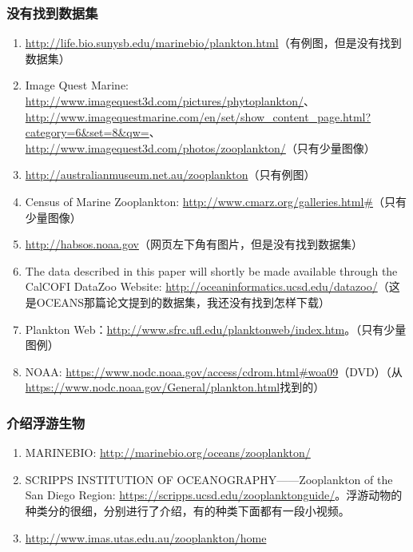 \subsubsection{没有找到数据集}
\begin{enumerate}
\item \url{http://life.bio.sunysb.edu/marinebio/plankton.html}（有例图，但是没有找到数据集）

\item Image Quest Marine: \url{http://www.imagequest3d.com/pictures/phytoplankton/}、\url{http://www.imagequestmarine.com/en/set/show_content_page.html?category=6&set=8&qw=}、\url{http://www.imagequest3d.com/photos/zooplankton/}（只有少量图像）

\item \url{http://australianmuseum.net.au/zooplankton}（只有例图）

\item Census of Marine Zooplankton: \url{http://www.cmarz.org/galleries.html#}（只有少量图像）

\item \url{http://habsos.noaa.gov}（网页左下角有图片，但是没有找到数据集）

\item The data described in this paper will shortly be made available through the CalCOFI DataZoo Website: \url{http://oceaninformatics.ucsd.edu/datazoo/}（这是OCEANS那篇论文提到的数据集，我还没有找到怎样下载）

\item Plankton Web：\url{http://www.sfrc.ufl.edu/planktonweb/index.htm}。（只有少量图例）

\item NOAA: \url{https://www.nodc.noaa.gov/access/cdrom.html#woa09}（DVD）（从\url{https://www.nodc.noaa.gov/General/plankton.html}找到的）
\end{enumerate}





\subsubsection{介绍浮游生物}
\begin{enumerate}
\item MARINEBIO: \url{http://marinebio.org/oceans/zooplankton/}

\item SCRIPPS INSTITUTION OF OCEANOGRAPHY——Zooplankton of the San Diego Region: \url{https://scripps.ucsd.edu/zooplanktonguide/}。浮游动物的种类分的很细，分别进行了介绍，有的种类下面都有一段小视频。


\item \url{http://www.imas.utas.edu.au/zooplankton/home}
\end{enumerate}



